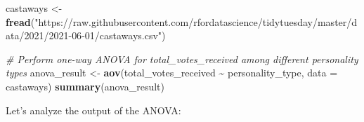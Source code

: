 \documentclass[
]{book}
\newenvironment{Shaded}{\begin{snugshade}}{\end{snugshade}}
\newcommand{\AttributeTok}[1]{\textcolor[rgb]{0.13,0.29,0.53}{#1}}
\newcommand{\CommentTok}[1]{\textcolor[rgb]{0.56,0.35,0.01}{\textit{#1}}}
\newcommand{\FunctionTok}[1]{\textcolor[rgb]{0.13,0.29,0.53}{\textbf{#1}}}
\newcommand{\NormalTok}[1]{#1}
\newcommand{\OtherTok}[1]{\textcolor[rgb]{0.56,0.35,0.01}{#1}}
\newcommand{\SpecialCharTok}[1]{\textcolor[rgb]{0.81,0.36,0.00}{\textbf{#1}}}
\newcommand{\StringTok}[1]{\textcolor[rgb]{0.31,0.60,0.02}{#1}}
\begin{document}
\begin{Shaded}
\begin{Highlighting}[]
\NormalTok{castaways }\OtherTok{\textless{}{-}} \FunctionTok{fread}\NormalTok{(}\StringTok{"https://raw.githubusercontent.com/rfordatascience/tidytuesday/master/data/2021/2021{-}06{-}01/castaways.csv"}\NormalTok{)}

\CommentTok{\# Perform one{-}way ANOVA for total\_votes\_received among different personality types}
\NormalTok{anova\_result }\OtherTok{\textless{}{-}} \FunctionTok{aov}\NormalTok{(total\_votes\_received }\SpecialCharTok{\textasciitilde{}}\NormalTok{ personality\_type, }\AttributeTok{data =}\NormalTok{ castaways)}
\FunctionTok{summary}\NormalTok{(anova\_result)}
\end{Highlighting}
\end{Shaded}

Let's analyze the output of the ANOVA:
\end{document}
